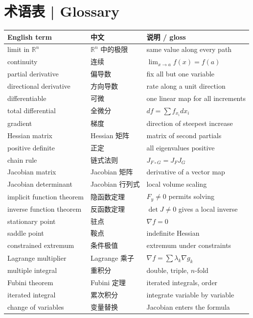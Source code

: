\documentclass[UTF8,11pt,a4paper]{ctexart}
\begin{document}
\section*{术语表 | Glossary}
\begingroup\small
\setlength{\tabcolsep}{4pt}
\begin{longtable}{@{}p{}p{}p{}@{}}
\toprule
\textbf{English term} & \textbf{中文} & \textbf{说明 / gloss} \\
\midrule
limit in $\mathbb R^n$ & $\mathbb R^n$ 中的极限 & same value along every path \\
continuity & 连续 & $\lim_{x\to a}f(x)=f(a)$ \\
partial derivative & 偏导数 & fix all but one variable \\
directional derivative & 方向导数 & rate along a unit direction \\
differentiable & 可微 & one linear map for all increments \\
total differential & 全微分 & $df=\sum f_{x_i}dx_i$ \\
gradient & 梯度 & direction of steepest increase \\
Hessian matrix & Hessian 矩阵 & matrix of second partials \\
positive definite & 正定 & all eigenvalues positive \\
chain rule & 链式法则 & $J_{F\circ G}=J_FJ_G$ \\
Jacobian matrix & Jacobian 矩阵 & derivative of a vector map \\
Jacobian determinant & Jacobian 行列式 & local volume scaling \\
implicit function theorem & 隐函数定理 & $F_y\ne0$ permits solving \\
inverse function theorem & 反函数定理 & $\det J\ne0$ gives a local inverse \\
stationary point & 驻点 & $\nabla f=0$ \\
saddle point & 鞍点 & indefinite Hessian \\
constrained extremum & 条件极值 & extremum under constraints \\
Lagrange multiplier & Lagrange 乘子 & $\nabla f=\sum\lambda_k\nabla g_k$ \\
multiple integral & 重积分 & double, triple, $n$-fold \\
Fubini theorem & Fubini 定理 & iterated integrals, order \\
iterated integral & 累次积分 & integrate variable by variable \\
change of variables & 变量替换 & Jacobian enters the formula \\

\end{longtable}
\end{document}
